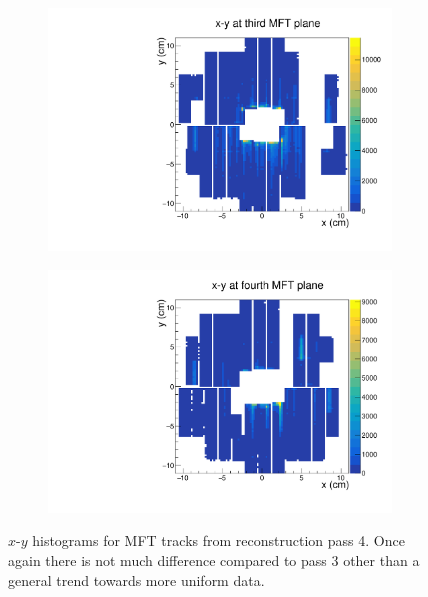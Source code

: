 \begin{figure}[h]
\begin{subfigure}[t]{.49\linewidth}
        \includegraphics[width=\linewidth]{Plots/pass4_MFT/x_y_3_pass4.pdf}
        \caption{}
        \label{}
    \end{subfigure}
    \hfill
    \begin{subfigure}[t]{.49\linewidth}
        \centering
        \includegraphics[width=\linewidth]{Plots/pass4_MFT/x_y_4_pass4.pdf}
        \caption{}
        \label{}
    \end{subfigure}
\caption[$x$-$y$ histograms of tracks at different planes in the MFT]{$x$-$y$ histograms for MFT tracks from reconstruction pass 4. Once again there is not much difference compared to pass 3 other than a general trend towards more uniform data. }
\label{fig:MFT_2D_pass4}
\end{figure}